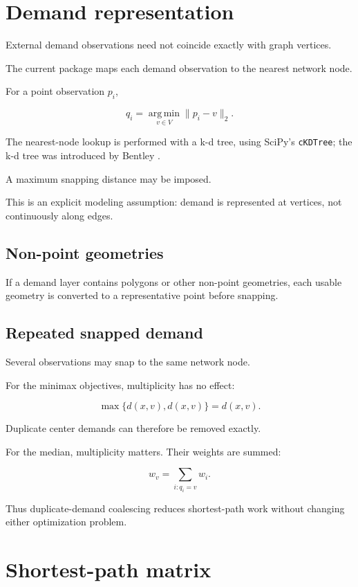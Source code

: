 \documentclass[11pt]{article}
\newcommand{\argmin}{\operatorname*{arg\,min}}
\begin{document}
\section{Demand representation}

External demand observations need not coincide exactly with graph vertices.

The current package maps each demand observation to the nearest network node.

For a point observation \(p_i\),

\[
q_i
=
\argmin_{v\in V}
\|p_i-v\|_2.
\]

The nearest-node lookup is performed with a k-d tree, using SciPy's
\texttt{cKDTree}; the k-d tree was introduced by Bentley
\cite{Bentley1975}.

A maximum snapping distance may be imposed.

This is an explicit modeling assumption: demand is represented at vertices, not
continuously along edges.

\subsection{Non-point geometries}

If a demand layer contains polygons or other non-point geometries, each usable
geometry is converted to a representative point before snapping.

\subsection{Repeated snapped demand}

Several observations may snap to the same network node.

For the minimax objectives, multiplicity has no effect:

\[
\max\{d(x,v),d(x,v)\}
=
d(x,v).
\]

Duplicate center demands can therefore be removed exactly.

For the median, multiplicity matters. Their weights are summed:

\[
w_v
=
\sum_{i:q_i=v} w_i.
\]

Thus duplicate-demand coalescing reduces shortest-path work without changing
either optimization problem.

\section{Shortest-path matrix}
\end{document}
